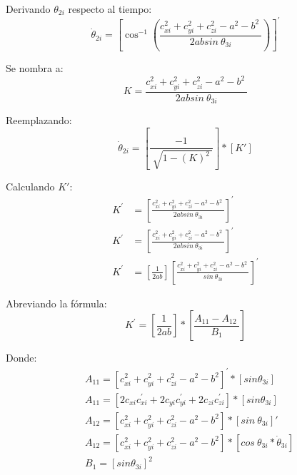                         \newpage


            Derivando  $\theta _{2i}$ respecto al tiempo:
            \begin{equation*}
                 \dot{ \theta }_{2i}= \left[ \cos ^{-1} \left( \frac{c_{xi}^{2}+c_{yi}^{2}+c_{zi}^{2}- a^{2}-b^{2}~}{2 ab sin~ \theta _{3i}} \right)  \right] ^{'} 
            \end{equation*}
            
            Se nombra a:
            \begin{equation*}
                K= \frac{c_{xi}^{2}+c_{yi}^{2}+c_{zi}^{2}- a^{2}-b^{2}~}{2 ab sin~ \theta _{3i}}
            \end{equation*}
            
            Reemplazando:
            \begin{equation}
                \dot{ \theta }_{2i}= \left[ \frac{-1}{\sqrt[]{1- \left( K \right) ^{2}~}} \right] \ast \left[ K' \right]
            \end{equation}
            
            Calculando   $K'$:
            \begin{align*}
                 K^{'}&=  \left[ \frac{c_{xi}^{2}+c_{yi}^{2}+c_{zi}^{2}- a^{2}-b^{2}~}{2 ab sin~ \theta _{3i}} \right] ^{'} \\
                 K^{'}&=  \left[ \frac{c_{xi}^{2}+c_{yi}^{2}+c_{zi}^{2}- a^{2}-b^{2}~}{2 ab sin~ \theta _{3i}} \right] ^{'} \\
                 K^{'}&= \left[ \frac{1}{2ab} \right]  \left[ \frac{c_{xi}^{2}+c_{yi}^{2}+c_{zi}^{2}- a^{2}-b^{2}~}{sin~ \theta _{3i}} \right] ^{'} 
            \end{align*}

            Abreviando la fórmula:
            \begin{equation*}
                 K^{'}= \left[ \frac{1}{2ab} \right] \ast \left[ \frac{A_{11}-A_{12}~}{B_{1}} \right]
            \end{equation*}

            Donde:
            \begin{align*}
                 &A_{11}= \left[ c_{xi}^{2}+c_{yi}^{2}+c_{zi}^{2}- a^{2}-b^{2} \right] ^{'}\ast \left[ sin  \theta _{3i} \right]  \\
                 &A_{11}= \left[ 2c_{xi}c_{xi}^{'}+2c_{yi}c_{yi}^{'}+2c_{zi}c_{zi}^{'} \right] \ast \left[ sin  \theta _{3i} \right] \\
                 &A_{12}= \left[ c_{xi}^{2}+c_{yi}^{2}+c_{zi}^{2}- a^{2}-b^{2} \right] \ast \left[ sin~ \theta _{3i} \right] ' \\
                 &A_{12}= \left[ c_{xi}^{2}+c_{yi}^{2}+c_{zi}^{2}- a^{2}-b^{2} \right] \ast \left[ cos~ \theta _{3i}\ast\dot{ \theta }_{3i} \right] \\
                 &B_{1}= \left[ sin  \theta _{3i} \right] ^{2}
            \end{align*}
            
